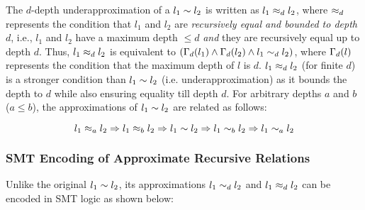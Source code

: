 The $d$-depth underapproximation of a \recursiveRelation{} $l_1 \sim{} l_2$
is written as $l_1 \approx_d l_2$, where $\approx_d$ represents
the condition that $l_1$ and $l_2$ are {\em recursively equal and bounded to depth $d$},
i.e., $l_1$ and $l_2$ have a maximum depth $\leq d$ {\em and}
they are recursively equal up to depth $d$.
Thus, $l_1 \approx_d l_2$ is equivalent to
$(\Gamma_d(l_1) \land \Gamma_d(l_2) \land l_1 \sim_d l_2)$,
where $\Gamma_d(l)$ represents the condition that the maximum
depth of $l$ is $d$.
$l_1 \approx_d l_2$ (for finite $d$) is a stronger condition than
$l_1\sim{}l_2$ (i.e. underapproximation)
as it bounds the depth to $d$ while also ensuring equality till depth $d$.
For arbitrary depths $a$ and $b$ ($a \leq b$),
the approximations of $l_1 \sim{} l_2$ are related as follows:

\begin{equation}
\label{eqn:approxrels}
l_1 \approx_a l_2 \Rightarrow l_1 \approx_b l_2 \Rightarrow l_1 \sim{} l_2 \Rightarrow l_1 \sim_b l_2 \Rightarrow l_1 \sim_a l_2
\end{equation}

\subsubsection{SMT Encoding of Approximate Recursive Relations}
Unlike the original \recursiveRelation{} $l_1 \sim{} l_2$,
its approximations $l_1\sim_dl_2$ and $l_1\approx_dl_2$ can be encoded in SMT logic as shown below:

